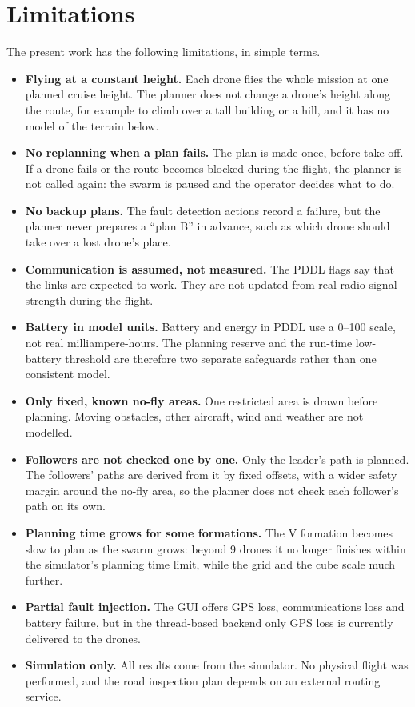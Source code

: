 \documentclass[11pt,a4paper,oneside]{report}
\newcommand{\maxV}{9}
\begin{document}
\section{Limitations}
The present work has the following limitations, in simple terms.
\begin{itemize}[itemsep=5pt]
  \item \textbf{Flying at a constant height.} Each drone flies the whole mission at one planned
        cruise height. The planner does not change a drone's height along the route, for example
        to climb over a tall building or a hill, and it has no model of the terrain below.
  \item \textbf{No replanning when a plan fails.} The plan is made once, before take-off. If a
        drone fails or the route becomes blocked during the flight, the planner is not called
        again: the swarm is paused and the operator decides what to do.
  \item \textbf{No backup plans.} The fault detection actions record a failure, but the planner
        never prepares a ``plan B'' in advance, such as which drone should take over a lost
        drone's place.
  \item \textbf{Communication is assumed, not measured.} The PDDL flags say that the links are
        expected to work. They are not updated from real radio signal strength during the
        flight.
  \item \textbf{Battery in model units.} Battery and energy in PDDL use a 0--100 scale, not real
        milliampere-hours. The planning reserve and the run-time low-battery threshold are
        therefore two separate safeguards rather than one consistent model.
  \item \textbf{Only fixed, known no-fly areas.} One restricted area is drawn before planning.
        Moving obstacles, other aircraft, wind and weather are not modelled.
  \item \textbf{Followers are not checked one by one.} Only the leader's path is planned. The
        followers' paths are derived from it by fixed offsets, with a wider safety margin
        around the no-fly area, so the planner does not check each follower's path on its own.
  \item \textbf{Planning time grows for some formations.} The V formation becomes slow to plan as
        the swarm grows: beyond \maxV{} drones it no longer finishes within the simulator's
        planning time limit, while the grid and the cube scale much further.
  \item \textbf{Partial fault injection.} The GUI offers GPS loss, communications loss and battery
        failure, but in the thread-based backend only GPS loss is currently delivered to the
        drones.
  \item \textbf{Simulation only.} All results come from the simulator. No physical flight was
        performed, and the road inspection plan depends on an external routing service.
\end{itemize}
\end{document}
